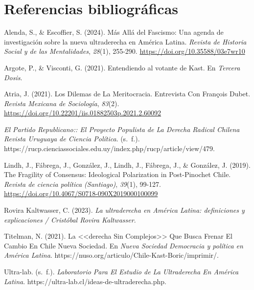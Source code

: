\documentclass[
  spanish,
  a4paper,
  oneside]{scrbook}
\newlength{\cslhangindent}
\newenvironment{CSLReferences}[2] %
 {\begin{list}{}{%
  \setlength{\itemindent}{0pt}
  \setlength{\leftmargin}{0pt}
  \setlength{\parsep}{0pt}
  \ifodd #1
   \setlength{\leftmargin}{\cslhangindent}
   \setlength{\itemindent}{-1\cslhangindent}
  \fi
  \setlength{\itemsep}{#2\baselineskip}}}
 {\end{list}}
\begin{document}

\chapter{Referencias
bibliográficas}\label{referencias-bibliogruxe1ficas}

\protect{}\label{refs}
\begin{CSLReferences}{1}{0}
Alenda, S., \& Escoffier, S. (2024). {Más Allá del Fascismo: Una agenda
de investigación sobre la nueva ultraderecha en América Latina}.
\emph{Revista de Historia Social y de las Mentalidades}, \emph{28}(1),
255-290. \url{https://doi.org/10.35588/03e7wr10}

Argote, P., \& Visconti, G. (2021). {Entendiendo al votante de Kast}. En
\emph{Tercera Dosis}.

Atria, J. (2021). Los Dilemas de La Meritocracia. {Entrevista} Con
{François Dubet}. \emph{Revista Mexicana de Sociología}, \emph{83}(2).
\url{https://doi.org/10.22201/iis.01882503p.2021.2.60092}

\emph{El {Partido Republicano}:: El Proyecto Populista de La Derecha
Radical Chilena \textbar{} {Revista Uruguaya} de {Ciencia Política}}.
(s.~f.).
https://rucp.cienciassociales.edu.uy/index.php/rucp/article/view/479.

Lindh, J., Fábrega, J., González, J., Lindh, J., Fábrega, J., \&
González, J. (2019). The {Fragility} of {Consensus}: {Ideological
Polarization} in {Post-Pinochet Chile}. \emph{Revista de ciencia
política (Santiago)}, \emph{39}(1), 99-127.
\url{https://doi.org/10.4067/S0718-090X2019000100099}

Rovira Kaltwasser, C. (2023). \emph{{La ultraderecha en América Latina:
definiciones y explicaciones / Cristóbal Rovira Kaltwasser}}.

Titelman, N. (2021). La \textless\textless derecha Sin
Complejos\textgreater\textgreater{} Que Busca Frenar El Cambio En
{Chile} \textbar{} {Nueva Sociedad}. En \emph{Nueva Sociedad \textbar{}
Democracia y política en América Latina}.
https://nuso.org/articulo/Chile-Kast-Boric/imprimir/.

Ultra-lab. (s.~f.). \emph{Laboratorio Para El {Estudio} de La
{Ultraderecha} En {América Latina}}.
https://ultra-lab.cl/ideas-de-ultraderecha.php.


\end{CSLReferences}
\end{document}

